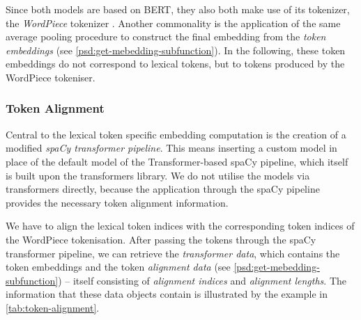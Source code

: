 \documentclass[11pt, numbers=noenddot]{scrreprt}
\let\cite\parencite  %
\begin{document}
\vspace{\baselineskip}
Since both models are based on BERT, they also both make use of its tokenizer, the \textit{WordPiece} tokenizer \cite{devlinBERTPretrainingDeep2019}. Another commonality is the application of the same average pooling procedure to construct the final embedding from the \textit{token embeddings} (see \cref{psd:get-mebedding-subfunction}). In the following, these token embeddings do not correspond to lexical tokens, but to tokens produced by the WordPiece tokeniser.

\subsubsection{Token Alignment}
Central to the lexical token specific embedding computation is the creation of a modified \textit{spaCy transformer pipeline}. This means inserting a custom model in place of the default model of the Transformer-based spaCy pipeline, which itself is built upon the transformers library. We do not utilise the models via transformers directly, because the application through the spaCy pipeline provides the necessary token alignment information.

 We have to align the lexical token indices with the corresponding token indices of the WordPiece tokenisation. After passing the tokens through the spaCy transformer pipeline, we can retrieve the \textit{transformer data}, which contains the token embeddings and the token \textit{alignment data} (see \cref{psd:get-mebedding-subfunction}) -- itself consisting of \textit{alignment indices} and \textit{alignment lengths}. The information that these data objects contain is illustrated by the example in \cref{tab:token-alignment}.

\end{document}
